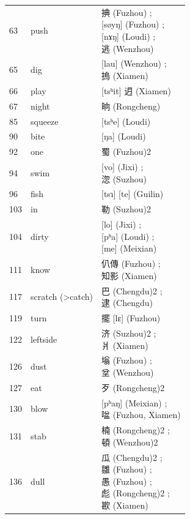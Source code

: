 \documentclass{scrbook}
\newcounter{c}[subsubsection]
\begin{document}
\begin{sloppypar}
\begin{appendices}
\begin{longtable}[htbp]{lll}
    63    & push  & \makecell[l]{捵 (Fuzhou) ; \\{[søyŋ]} (Fuzhou) ; \\{[nɤŋ] (Loudi)} ; \\逃 (Wenzhou)} \\
    65    & dig   & \makecell[l]{{[lau]} (Wenzhou) ; \\摀 (Xiamen)} \\
    66    & play  & [tsʰit] 迌 (Xiamen) \\
    67    & night & 晌 (Rongcheng) \\
    85    & squeeze & [tsʰe] (Loudi) \\
    90    & bite  & [ŋa] (Loudi) \\
    92    & one   & 蜀 (Fuzhou)2 \\
    94    & swim  & \makecell[l]{{[vo]} (Jixi) ; \\淴 (Suzhou)} \\
    96    & fish  & [tsɿ] [te] (Guilin) \\
    103   & in    & 勒 (Suzhou)2 \\
    104   & dirty & \makecell[l]{{[lo]} (Jixi) ; \\{[pʰa]} (Loudi) ; \\{[me]} (Meixian)} \\
    111   & know  & \makecell[l]{仈傳 (Fuzhou) ; \\知影 (Xiamen)} \\
    117   & scratch (>catch) & \makecell[l]{巴 (Chengdu)2 ; \\逮 (Chengdu)} \\
    119   & turn  & 擺 [lɛ] (Fuzhou) \\
    122   & leftside & \makecell[l]{济 (Suzhou)2 ; \\爿 (Xiamen)} \\
    126   & dust  & \makecell[l]{塕 (Fuzhou) ; \\坌 (Wenzhou)} \\
    127   & eat   & 歹 (Rongcheng)2 \\
    130   & blow  & \makecell[l]{{[pʰaŋ]} (Meixian) ; \\㖹 (Fuzhou, Xiamen)} \\
    131   & stab  & \makecell[l]{楠 (Rongcheng)2 ; \\頓 (Wenzhou)2} \\
    136   & dull  & \makecell[l]{瓜 (Chengdu)2 ; \\雛 (Fuzhou) ; \\愚 (Fuzhou) ; \\彪 (Rongcheng)2 ; \\歁 (Xiamen)} \\

\end{longtable}
\end{appendices}
\end{sloppypar}
\end{document}
